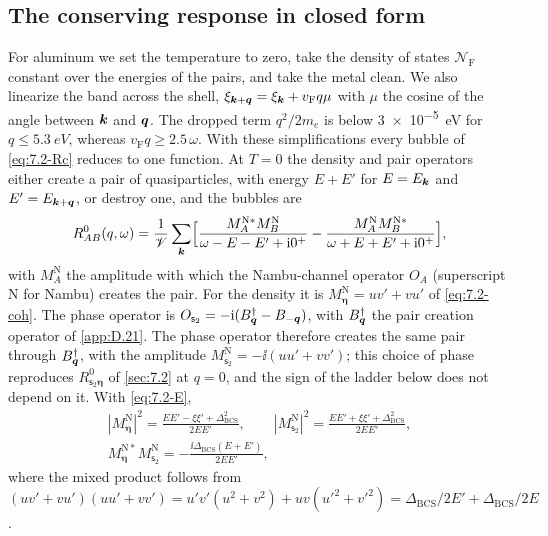 \subsection{The conserving response in closed form}\label{sec:15.1-closed}

For aluminum we set the temperature to zero, take the density of states $\mathcal{N}_{\mathrm{F}}$ constant over the energies of the pairs, and take the metal clean. We also linearize the band across the shell, $\xi_{\bm{k}+\bm{q}} = \xi_{\bm{k}} + v_{\mathrm{F}}q\mu$ with $\mu$ the cosine of the angle between $\bm{k}$ and $\bm{q}$. The dropped term $q^2/2m_e$ is below \SI{3e-5}{eV} for $q \le \SI{5.3}{eV}$, whereas $v_{\mathrm{F}}q \ge 2.5\,\omega$. With these simplifications every bubble of \cref{eq:7.2-Rc} reduces to one function. At $T = 0$ the density and pair operators either create a pair of quasiparticles, with energy $E + E'$ for $E = E_{\bm{k}}$ and $E' = E_{\bm{k}+\bm{q}}$, or destroy one, and the bubbles are
\begin{equation}
  R^0_{AB}(q,\omega) = \frac{1}{\mathscr{V}}\sum_{\bm{k}}\Bigl[\frac{M^{\mathrm{N}*}_AM^{\mathrm{N}}_B}{\omega - E - E' + \mathrm{i}0^+} - \frac{M^{\mathrm{N}}_AM^{\mathrm{N}*}_B}{\omega + E + E' + \mathrm{i}0^+}\Bigr] ,
  \label{eq:15.1-bubble}
\end{equation}
with $M^{\mathrm{N}}_A$ the amplitude with which the Nambu-channel operator $O_A$ (superscript N for Nambu) creates the pair. For the density it is $M^{\mathrm{N}}_{\boldsymbol{\eta}} = uv' + vu'$ of \cref{eq:7.2-coh}. The phase operator is $O_{\mathsf{s}_2} = -\mathrm{i}(B^\dagger_{\bm{q}} - B_{-\bm{q}})$, with $B^\dagger_{\bm{q}}$ the pair creation operator of \cref{app:D.21}. The phase operator therefore creates the same pair through $B^\dagger_{\bm{q}}$, with the amplitude $M^{\mathrm{N}}_{\mathsf{s}_2} = -\ii(uu' + vv')$; this choice of phase reproduces $R^0_{\mathsf{s}_2\boldsymbol{\eta}}$ of \cref{sec:7.2} at $q = 0$, and the sign of the ladder below does not depend on it. With \cref{eq:7.2-E},
\begin{gather*}
  |M^{\mathrm{N}}_{\boldsymbol{\eta}}|^2 = \frac{EE' - \xi\xi' + \Delta_{\mathrm{BCS}}^2}{2EE'}, \qquad
  |M^{\mathrm{N}}_{\mathsf{s}_2}|^2 = \frac{EE' + \xi\xi' + \Delta_{\mathrm{BCS}}^2}{2EE'}, \\
  M^{\mathrm{N}*}_{\boldsymbol{\eta}}M^{\mathrm{N}}_{\mathsf{s}_2} = -\frac{\ii\Delta_{\mathrm{BCS}}(E + E')}{2EE'} ,
\end{gather*}
where the mixed product follows from $(uv' + vu')(uu' + vv') = u'v'(u^2 + v^2) + uv(u'^2 + v'^2) = \Delta_{\mathrm{BCS}}/2E' + \Delta_{\mathrm{BCS}}/2E$.

